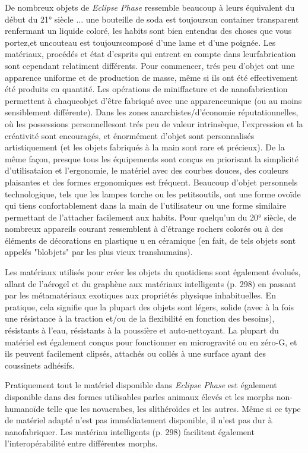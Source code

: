 De nombreux objets de \emph{Eclipse Phase} ressemble beaucoup à leurs équivalent du début du 21° siècle ... une bouteille de soda est toujoursun container transparent renfermant un liquide coloré, les habits sont bien entendus des choses que vous portez,et uncouteau est toujourscomposé d'une lame et d'une poignée. Les matériaux, procédés et état d'esprits qui entrent en compte dans leurfabrication sont cependant relatiment différents. Pour commencer, trés peu d'objet ont une apparence uniforme et de production de masse, même si ils ont été effectivement été produits en quantité. Les opérations de miniffacture et de nanofabrication permettent à chaqueobjet d'être fabriqué avec une apparenceunique (ou au moins sensiblement différente). Dans les zones anarchistes/d'économie réputationnelles, où les possessions personnellesont trés peu de valeur intrinsèque, l'expression et la créativité sont encouragés, et énormément d'objet sont personnalisés artistiquement (et les objets fabriqués à la main sont rare et précieux). De la même façon, presque tous les équipements sont conçus en priorisant la simplicité d'utilisataion et l'ergonomie, le matériel avec des courbes douces, des couleurs plaisantes et des formes ergonomiques est fréquent. Beaucoup d'objet personnels technologique, tels que les lampes torche ou les petitsoutils, ont une forme ovoïde qui tiens confortablement dans la main de l'utilisateur  ou une forme similaire permettant de l'attacher facilement aux habits. Pour quelqu'un du 20° siècle, de nombreux appareils courant ressemblent à d'étrange rochers colorés ou à des éléments de décorations en plastique u en céramique (en fait, de tels objets sont appelés "blobjets" par les plus vieux transhumains). 

Les matériaux utilisés pour créer les objets du quotidiens sont également évolués, allant de l'aérogel et du graphène aux matériaux intelligents (p. 298) en passant par les métamatériaux exotiques aux propriétés physique inhabituelles. En pratique, cela signifie que la plupart des objets sont légers, solide (avec à la fois une résistance à la traction et/ou de la flexibilité en fonction des besoins), résistants à l'eau, résistants à la poussière et auto-nettoyant. La plupart du matériel est également conçus pour fonctionner en microgravité ou en zéro-G, et ils peuvent facilement clipsés, attachés ou collés à une surface ayant des coussinets adhésifs. 

Pratiquement tout le matériel disponible dans \emph{Eclipse Phase} est également disponible dans des formes utilisables parles animaux élevés et les morphs non-humanoïde telle que les novacrabes, les slithéroïdes et les autres. Même si ce type de matériel adapté n'est pas immédiatement disponible, il n'est pas dur à nanofabriquer. Les matériau intelligents (p. 298) facilitent également l'interopérabilité entre différentes morphs. 

